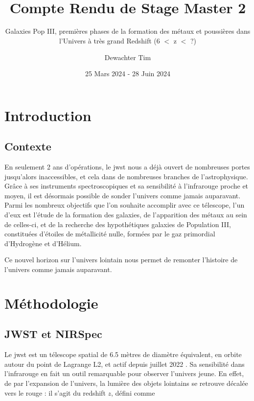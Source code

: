 \documentclass[11pt, a4paper]{article}
\title{\textbf{ \\{\Huge Compte Rendu de Stage Master 2}}}
\subtitle{Galaxies Pop III, premières phases de la formation des métaux et poussières dans l'Univers à très grand Redshift (6 $<$ z $<$ ?)}
\author{Dewachter Tim}
\date{25 Mars 2024 - 28 Juin 2024}
\begin{document}
\maketitle

\newpage

\tableofcontents

\newpage

\section{Introduction}

\subsection{Contexte}

En seulement 2 ans d'opérations, le \gls{jwst} nous a déjà ouvert de nombreuses portes jusqu'alors inaccessibles, et cela dans de nombreuses branches de l'astrophysique. Grâce à ses instruments spectroscopiques et sa sensibilité à l'infrarouge proche et moyen, il est désormais possible de sonder l'univers comme jamais auparavant. Parmi les nombreux objectifs que l'on souhaite accomplir avec ce télescope, l'un d'eux est l'étude de la formation des galaxies, de l'apparition des métaux au sein de celles-ci, et de la recherche des hypothétiques galaxies de Population III, constituées d'étoiles de métallicité nulle, formées par le gaz primordial d'Hydrogène et d'Hélium.

Ce nouvel horizon sur l'univers lointain nous permet de remonter l'histoire de l'univers comme jamais auparavant. \cite{2023arXiv230600953M}



\section{Méthodologie}

\subsection{JWST et NIRSpec}

Le \gls{jwst} est un télescope spatial de 6.5 mètres de diamètre équivalent, en orbite autour du point de Lagrange L2, et actif depuis juillet 2022 \cite{jwst_website}. Sa sensibilité dans l'infrarouge en fait un outil remarquable pour observer l'univers jeune. En effet, de par l'expansion de l'univers, la lumière des objets lointains se retrouve décalée vers le rouge : il s'agit du redshift $z$, défini comme 
\end{document}
